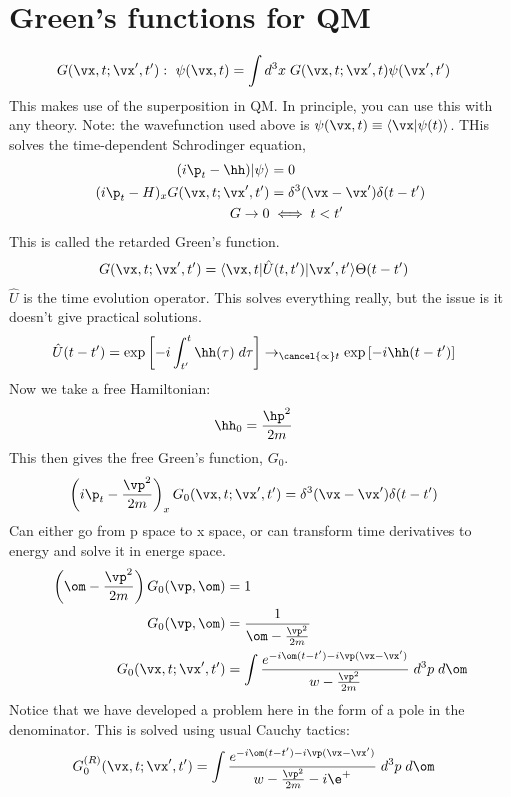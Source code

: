 \documentclass[a4paper, 11pt, normalem]{report}
\begin{document}
\section{Green's functions for QM}
\begin{align}
    G(\vx,t;\vx',t'):~ \psi(\vx,t) &= \int d^3x\; G(\vx,t;\vx',t)\psi(\vx',t')
\end{align}
This makes use of the superposition in QM.
In principle, you can use this with any theory. 
Note: the wavefunction used above is $\psi(\vx,t) \equiv \langle\vx|\psi(t)\rangle$.
THis solves the time-dependent Schrodinger equation, 
\begin{align}
    (i\p_t - \hh)|\psi\rangle &= 0 \\
    (i\p_t - H)_xG(\vx,t;\vx',t') &= \delta^3(\vx-\vx')\delta(t-t') \\
    G\to 0 &\iff t < t'
\end{align}
This is called the retarded Green's function.
\begin{align}
    G(\vx,t;\vx',t') &= \langle\vx,t|\hat{U}(t,t')|\vx',t'\rangle\Theta(t-t')
\end{align}
$\hat{U}$ is the time evolution operator. 
This solves everything really, but the issue is it doesn't give practical solutions.
\begin{align}
    \hat{U}(t-t') &= \exp\left[-i\int_{t'}^{t} \hh(\tau)\; d\tau\right] \to_{\cancel{\propto} t}  \exp\left[-i\hh(t-t')\right] 
\end{align}
Now we take a free Hamiltonian:
\begin{align}
    \hh_0 &= \frac{\hp^2}{2m}
\end{align}
This then gives the free Green's function, $G_0$.
\begin{align}
    \left(i\p_t-\frac{\vp^2}{2m}\right)_xG_0(\vx,t;\vx',t') &= \delta^3(\vx-\vx')\delta(t-t')
\end{align}
Can either go from p space to x space, or can transform time derivatives to energy and solve it in energe space. 
\begin{align}
    \left(\om-\frac{\vp^2}{2m}\right) G_0(\vp,\om) &= 1 \\
    G_0(\vp,\om) &= \frac{1}{\om-\frac{\vp^2}{2m}} \\
    G_0(\vx,t;\vx',t') &= \int \frac{e^{-i\om(t-t')-i\vp(\vx-\vx')}}{w-\frac{\vp^2}{2m}}  \;d^3p\;d\om
\end{align}
Notice that we have developed a problem here in the form of a pole in the denominator. 
This is solved using usual Cauchy tactics: 
\begin{align}
    G_0^{(R)}(\vx,t;\vx',t') &= \int \frac{e^{-i\om(t-t')-i\vp(\vx-\vx')}}{w-\frac{\vp^2}{2m} - i\e^+}  \;d^3p\;d\om
\end{align}
\end{document}
